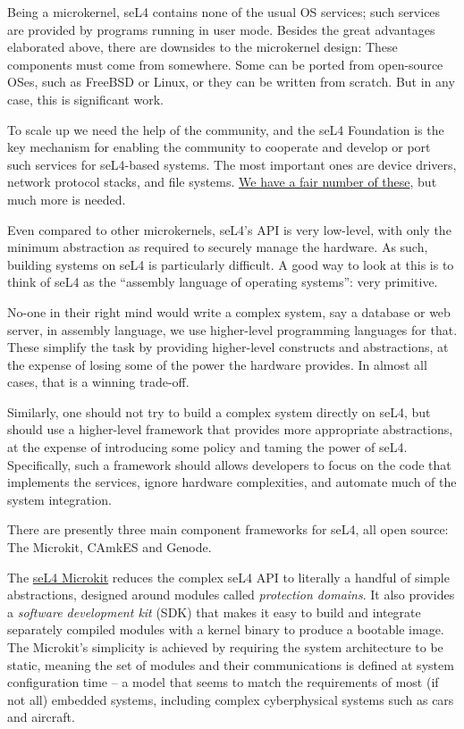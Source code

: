 \documentclass[english,a4paper,12pt]{report}
\begin{document}
  Being a microkernel, seL4 contains none of the usual OS
  services; such services are  provided by  programs running in user
  mode. Besides the great advantages elaborated above,
  there are downsides to the microkernel design:  These components
  must come from somewhere. Some can be ported from open-source OSes, such as
  FreeBSD or Linux, or they can be written from scratch. But in any
  case, this is significant work.

  To scale up we need the help of the community, and the seL4
  Foundation is the key mechanism for enabling the community to
  cooperate and develop or port such services for seL4-based
  systems. The most important ones are device drivers, network
  protocol stacks, and file
  systems. \href{https://docs.sel4.systems/projects/available-user-components.html}{We
    have a fair number of these}, but much  more is needed.

  Even compared to other microkernels, seL4's API is very low-level,
  with only the minimum abstraction as required to securely manage the
  hardware. As such, building systems on seL4 is particularly
  difficult. A good way to look at this is to think of seL4 as the
  ``assembly language of operating systems'': very primitive.

  No-one in their right mind would write a complex system, say a
  database or web server, in assembly language, we use higher-level
  programming languages for that. These simplify the task by providing
  higher-level constructs and abstractions, at the expense of losing
  some of the power the hardware provides. In almost all cases, that
  is a winning trade-off.

  Similarly, one should not try to build a complex system directly on
  seL4, but should use a higher-level framework that provides more
  appropriate abstractions, at the expense of introducing some policy
  and taming the power of seL4. Specifically, such a framework should allows developers
  to focus on the code that implements the services, ignore hardware
  complexities, and automate
  much of the system integration.

  There are presently three main
  component frameworks for seL4, all open source: The Microkit, CAmkES
  and Genode.

  The \href{https://trustworthy.systems/projects/microkit/}{seL4 Microkit} reduces
  the complex seL4 API to literally a handful of simple abstractions,
  designed around modules called \emph{protection domains}. It also
  provides a \emph{software development kit} (SDK) that makes it easy
  to build and integrate separately compiled modules with a kernel
  binary to produce a bootable image. The Microkit's simplicity is
  achieved by requiring the system architecture to be static, meaning
  the set of modules and their communications is defined at system
  configuration time -- a model that seems to match the requirements
  of most (if not all) embedded systems, including complex
  cyberphysical systems such as cars and aircraft.
\end{document}
